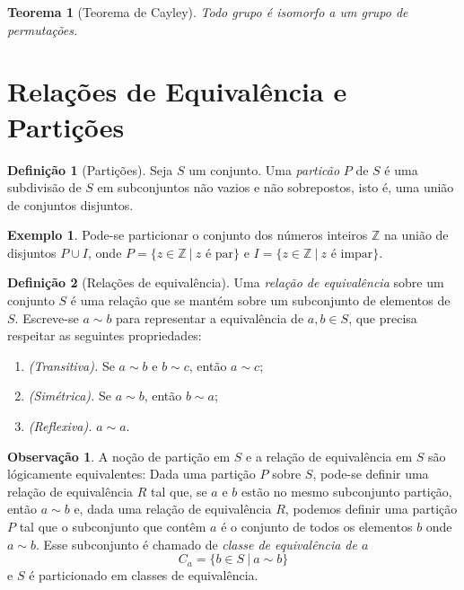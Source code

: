 \documentclass[a4paper,12pt]{report}
\theoremstyle{plain}
\newtheorem{teorema}{Teorema}[section]
\theoremstyle{definition}
\newtheorem{definicao}{Definição}[section]
\newtheorem{observacao}{Observação}[section]
\newtheorem{exemplo}{Exemplo}[section]
\begin{document}
\begin{teorema}[Teorema de Cayley]
	Todo grupo é isomorfo a um grupo de permutações.
\end{teorema}

\section{Relações de Equivalência e Partições}

\begin{definicao}[Partições]
	Seja \(S\) um conjunto. Uma \emph{particão} \(P\) de
	\(S\) é uma subdivisão de \(S\) em subconjuntos não vazios e não
	sobrepostos, isto é, uma união de conjuntos disjuntos.	
\end{definicao}

\begin{exemplo}
	Pode-se particionar o conjunto dos números inteiros
	\(\mathbb{Z}\) na união de disjuntos \(P\cup I\), onde
	\(P = \{z \in \mathbb{Z} \ |\ z \text{ é par}\}\) e
	\(I = \{z \in \mathbb{Z} \ |\ z \text{ é impar}\}\).
\end{exemplo}

\begin{definicao}[Relações de equivalência]
	Uma \emph{relação de equivalência} sobre um conjunto
	\(S\) é uma relação que se mantém sobre um subconjunto de elementos de
	\(S\). Escreve-se \(a\sim b\) para representar a equivalência de
	\(a, b \in S\), que precisa respeitar as seguintes propriedades:
	\begin{enumerate}
		\item \emph{(Transitiva).} Se \(a\sim b\) e \(b\sim c\), então \(a\sim c\);
		\item \emph{(Simétrica).} Se \(a\sim b\), então \(b\sim a\);
		\item \emph{(Reflexiva).} \(a\sim a\).
	\end{enumerate}
\end{definicao}

\begin{observacao}
	A noção de partição em \(S\) e a relação de equivalência em \(S\) são
	lógicamente equivalentes: Dada uma partição \(P\) sobre \(S\), pode-se
	definir uma relação de equivalência \(R\) tal que, se \(a\) e \(b\)
	estão no mesmo subconjunto partição, então \(a\sim b\) e, dada uma
	relação de equivalência \(R\), podemos definir uma partição \(P\) tal
	que o subconjunto que contêm \(a\) é o conjunto de todos os elementos
	\(b\) onde \(a\sim b\). Esse subconjunto é chamado de \emph{classe de
		equivalência de \(a\)}
	\[C_a = \{b\in S \ | \ a\sim b\}\]
	e \(S\) é particionado em classes de equivalência.
\end{observacao}
\end{document}
